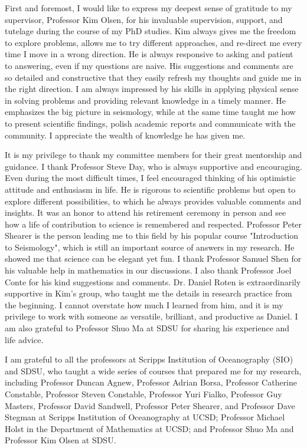 \begin{frontmatter}
\begin{acknowledgements}
        First and foremost, I would like to express my deepest sense of gratitude to my supervisor, Professor Kim Olsen, for his invaluable supervision, support, and tutelage during the course of my PhD studies. Kim always gives me the freedom to explore problems, allows me to try different approaches, and re-direct me every time I move in a wrong direction. He is always responsive to asking and patient to answering, even if my questions are naive. His suggestions and comments are so detailed and constructive that they easily refresh my thoughts and guide me in the right direction. I am always impressed by his skills in applying physical sense in solving problems and providing relevant knowledge in a timely manner. He emphasizes the big picture in seismology, while at the same time taught me how to present scientific findings, polish academic reports and communicate with the community. I appreciate the wealth of knowledge he has given me.

        It is my privilege to thank my committee members for their great mentorship and guidance. I thank Professor Steve Day, who is always supportive and encouraging. Even during the most difficult times, I feel encouraged thinking of his optimistic attitude and enthusiasm in life. He is rigorous to scientific problems but open to explore different possibilities, to which he always provides valuable comments and insights. It was an honor to attend his retirement ceremony in person and see how a life of contribution to science is remembered and respected. Professor Peter Shearer is the person leading me to this field by his popular course "Introduction to Seismology", which is still an important source of answers in my research. He showed me that science can be elegant yet fun. I thank Professor Samuel Shen for his valuable help in mathematics in our discussions. I also thank Professor Joel Conte for his kind suggestions and comments. Dr. Daniel Roten is extraordinarily supportive in Kim's group, who taught me the details in research practice from the beginning. I cannot overstate how much I learned from him, and it is my privilege to work with someone as versatile, brilliant, and productive as Daniel. I am also grateful to Professor Shuo Ma at SDSU for sharing his experience and life advice.

        I am grateful to all the professors at Scripps Institution of Oceanography (SIO) and SDSU, who taught a wide series of courses that prepared me for my research, including Professor Duncan Agnew, Professor Adrian Borsa, Professor Catherine Constable, Professor Steven Constable, Professor Yuri Fialko, Professor Guy Masters, Professor David Sandwell, Professor Peter Shearer, and Professor Dave Stegman at Scripps Institution of Oceanography at UCSD; Professor Michael Holst in the Department of Mathematics at UCSD; and Professor Shuo Ma and Professor Kim Olsen at SDSU.


\end{acknowledgements}
\end{frontmatter}

